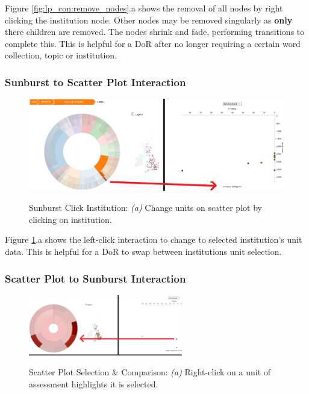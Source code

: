 \documentclass[a4paper, 11pt]{article}
\begin{document}
\noindent Figure \ref{fig:lp_con:remove_nodes}.a shows the removal of all nodes by right clicking the institution node. Other nodes may be removed singularly as \textbf{only} there children are removed. The nodes shrink and fade, performing transitions to complete this.  This is helpful for a DoR after no longer requiring a certain word collection, topic or institution.

\subsubsection{Sunburst to Scatter Plot Interaction}

\begin{figure}[hbt!]
	\centering
      \includegraphics[width=\textwidth]{imgs/sb_sc_int/SB_SC_changedata.png} \\
	\caption{Sunburst Click Institution: 
	\textit{(a)} Change units on scatter plot by clicking on institution.}
    \label{fig:sb_sc_int:changedata}
     \noindent\makebox[\linewidth]{\rule{\textwidth}{0.4pt}}
\end{figure}

\noindent Figure \ref{fig:sb_sc_int:changedata}.a shows the left-click interaction to change to selected institution's unit data. This is helpful for a DoR to swap between institutions unit selection.


\subsubsection{Scatter Plot to Sunburst Interaction}
\begin{figure}[hbt!]
	\centering
      \includegraphics[width=0.6\textwidth]{imgs/sc_sb_int/select_UoA_and_compare.png} \\
	\caption{Scatter Plot Selection \& Comparison: 
	\textit{(a)} Right-click on a unit of assessment highlights it is selected.}
    \label{fig:sc_sb_int:uoa_select}
    \noindent\makebox[\linewidth]{\rule{\textwidth}{0.4pt}}
\end{figure}
\end{document}
